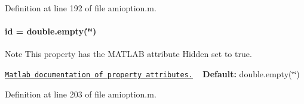 Definition at line 192 of file amioption.\+m.

\hypertarget{classamioption_acf2488b95c97e0378c9bf49de3b50f28}{}
\paragraph[{id}]{\setlength{\rightskip}{0pt plus 5cm}id = double.\+empty(\char`\"{}\char`\"{})}\label{classamioption_acf2488b95c97e0378c9bf49de3b50f28}
\begin{DoxyNote}{Note}
This property has the M\+A\+T\+L\+A\+B attribute {\ttfamily Hidden} set to true. 

\href{http://www.mathworks.com/help/matlab/matlab_oop/property-attributes.html}{\tt Matlab documentation of property attributes.} ~\newline
{\bfseries Default\+:} double.\+empty(\char`\"{}\char`\"{}) 
\end{DoxyNote}


Definition at line 203 of file amioption.\+m.

